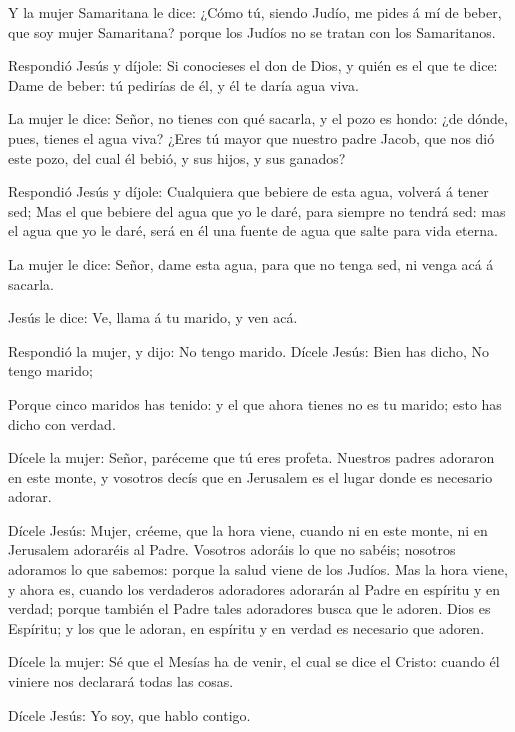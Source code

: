  Y la mujer Samaritana le dice: ¿Cómo tú, siendo Judío, me
pides á mí de beber, que soy mujer Samaritana? porque los Judíos no se
tratan con los Samaritanos.

 Respondió Jesús y díjole: Si conocieses el don de Dios, y
quién es el que te dice: Dame de beber: tú pedirías de él, y él te daría
agua viva.

 La mujer le dice: Señor, no tienes con qué sacarla, y el
pozo es hondo: ¿de dónde, pues, tienes el agua viva?  ¿Eres
tú mayor que nuestro padre Jacob, que nos dió este pozo, del cual él
bebió, y sus hijos, y sus ganados?

 Respondió Jesús y díjole: Cualquiera que bebiere de esta
agua, volverá á tener sed;  Mas el que bebiere del agua que
yo le daré, para siempre no tendrá sed: mas el agua que yo le daré, será
en él una fuente de agua que salte para vida eterna.

 La mujer le dice: Señor, dame esta agua, para que no tenga
sed, ni venga acá á sacarla.

 Jesús le dice: Ve, llama á tu marido, y ven acá.

 Respondió la mujer, y dijo: No tengo marido. Dícele Jesús:
Bien has dicho, No tengo marido;

 Porque cinco maridos has tenido: y el que ahora tienes no
es tu marido; esto has dicho con verdad.

 Dícele la mujer: Señor, paréceme que tú eres profeta.
 Nuestros padres adoraron en este monte, y vosotros decís
que en Jerusalem es el lugar donde es necesario adorar.

 Dícele Jesús: Mujer, créeme, que la hora viene, cuando ni
en este monte, ni en Jerusalem adoraréis al Padre. 
Vosotros adoráis lo que no sabéis; nosotros adoramos lo que sabemos:
porque la salud viene de los Judíos.  Mas la hora viene, y
ahora es, cuando los verdaderos adoradores adorarán al Padre en espíritu
y en verdad; porque también el Padre tales adoradores busca que le
adoren.  Dios es Espíritu; y los que le adoran, en espíritu
y en verdad es necesario que adoren.

 Dícele la mujer: Sé que el Mesías ha de venir, el cual se
dice el Cristo: cuando él viniere nos declarará todas las cosas.

 Dícele Jesús: Yo soy, que hablo contigo.

